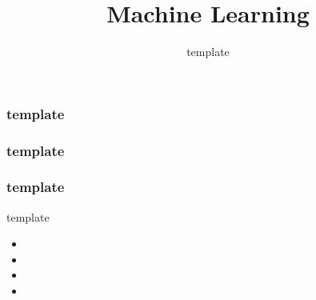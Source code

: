 \documentclass{formation}
\title{Machine Learning}
\subtitle{template}
\begin{document}
\maketitle

\begin{frame}
  \frametitle{template}
\end{frame}

\begin{frame}
  \frametitle{template}
\end{frame}

\begin{frame}
  \frametitle{template}

  template
  
  
  \begin{itemize}
  \item 
  \item 
  \item 
  \item 
  \end{itemize}

  \begin{minipage}[l]{0.49\linewidth}
  \end{minipage}\hfill
  \begin{minipage}[l]{0.49\linewidth}
  \end{minipage}\hfill

\end{frame}
\end{document}
